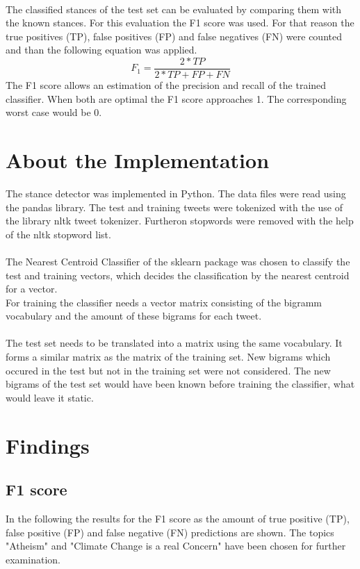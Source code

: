 \documentclass[a4paper,12pt,twoside]{article}
\begin{document}
\\
The classified stances of the test set can be evaluated by comparing them with the known stances. For this evaluation the F1 score was used. For that reason the true positives (TP), false positives (FP) and false negatives (FN) were counted and than the following equation was applied.
\begin{equation}
F_1 = \frac{2*TP}{ 2*TP + FP + FN}
\end{equation}
The F1 score allows an estimation of the precision and recall of the trained classifier. When both are optimal the F1 score approaches 1. The corresponding worst case would be 0.

\section{About the Implementation}
The stance detector was implemented in Python. The data files were read using the pandas library. The test and training tweets were tokenized with the use of the library nltk tweet tokenizer. Furtheron stopwords were removed with the help of the nltk stopword list.\\
\\
The Nearest Centroid Classifier  of the sklearn package was chosen to classify the test and training vectors, which decides the classification by the nearest centroid for a vector.\\
For training the classifier needs a vector matrix consisting of the bigramm vocabulary and the amount of these bigrams for each tweet.\\
\\
The test set needs to be translated into a matrix using the same vocabulary. It forms a similar matrix as the matrix of the training set. New bigrams which occured in the test but not in the training set were not considered. The new bigrams of the test set would have been known before training the classifier, what would leave it static.

\section{Findings}

\subsection{F1 score}
In the following the results for the F1 score as the amount of true positive (TP), false positive (FP) and false negative (FN) predictions are shown. The topics "Atheism" and "Climate Change is a real Concern" have been chosen for further examination.\\
\\
\end{document}
